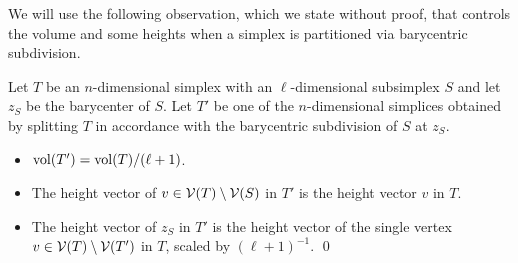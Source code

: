 \documentclass[10pt,a4paper]{article}
\begin{document}



We will use the following observation, which we state without proof, 
that controls the volume and some heights when a simplex is partitioned via barycentric subdivision.

\begin{lemma}\label{lemma:stardivision}
    Let $T$ be an $n$-dimensional simplex with an $\ell$-dimensional subsimplex $S$ and let $z_S$ be the barycenter of $S$. 
    Let $T'$ be one of the $n$-dimensional simplices obtained by splitting $T$ in accordance with the barycentric subdivision of $S$ at $z_{S}$.
    \begin{itemize}
        \item $\operatorname{vol}(T') = \operatorname{vol}(T) / (\ell+1)$. 
        \item The height vector of $v \in {\mathcal V}(T) \setminus {\mathcal V}(S)$ in $T'$ is the height vector $v$ in $T$.
        \item The height vector of $z_S$ in $T'$ is the height vector of the single vertex $v \in {\mathcal V}(T) \setminus {\mathcal V}(T')$ in $T$,
scaled by $(\ell+1)^{-1}$.
    \hfill\qed
    \end{itemize}
\end{lemma}
\end{document}
